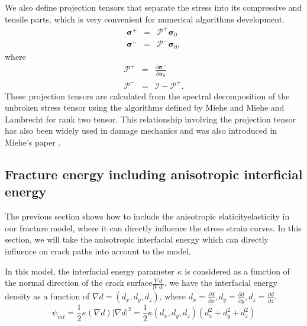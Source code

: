 \documentclass[3p,10pt,sort&compress]{elsarticle}
\newcommand{\dkimadd}[1]{{\color{red}#1}}
\newcommand{\dkimdel}[1]{{\color{yellow}#1}}
\begin{document}
We also define projection tensors that separate the stress into its compressive and tensile parts, which is very convenient for numerical algorithms development.
\begin{eqnarray}
	\boldsymbol{\sigma}^+ &=& \boldsymbol{\mathcal{P^+}} \boldsymbol{\sigma}_0\label{eq:sigmap_u} \\
	\boldsymbol{\sigma}^- &=& \boldsymbol{\mathcal{P^-}} \boldsymbol{\sigma}_0,
\end{eqnarray}
where
\begin{eqnarray}
	\boldsymbol{\mathcal{P^+}}&=& \frac{\partial \boldsymbol{\sigma}^+}{\partial \boldsymbol{\sigma}_0} \label{eq:proj} \\
	\boldsymbol{\mathcal{P^-}} &=& \mathcal{I} - \boldsymbol{\mathcal{P^+}}.
\end{eqnarray}
These projection tensors are calculated from the spectral decomposition of the unbroken stress tensor using the algorithms defined by Miehe \cite{miehe1998comparison} and Miehe and Lambrecht \cite{miehe2001algorithms} for rank two tensor. This relationship involving the projection tensor has also been widely used in damage mechanics \cite{lubarda1994damage, murakami2012continuum} and was also introduced in Miehe's paper \cite{miehe2010phase}.


\subsection{Fracture energy including anisotropic interficial energy}
The previous section shows how to include the anisotropic \dkimdel{elaticity}\dkimadd{elasticity} in our fracture model, where it can directly influence the stress strain curves. In this section, we will take the anisotropic interfacial energy which can directly influence on crack paths into account to the model.


In this model, the interfacial energy parameter $\kappa$ is considered as a function of the normal direction of the crack surface$\frac{\nabla d}{|\nabla d|}$. we have the interfacial energy density as a function of $\nabla d=(d_x,d_y,d_z)$, where $d_x=\frac{\partial d}{\partial x}, d_y = \frac{\partial d}{\partial y}, d_z = \frac{\partial d}{\partial z}$.
\begin{equation}
  \psi_{int} = \frac{1}{2}\kappa(\nabla d)|\nabla d|^2 = \frac{1}{2}\kappa(d_x, d_y, d_z)(d_x^2+d_y^2 + d_z^2)
\end{equation}
\end{document}
